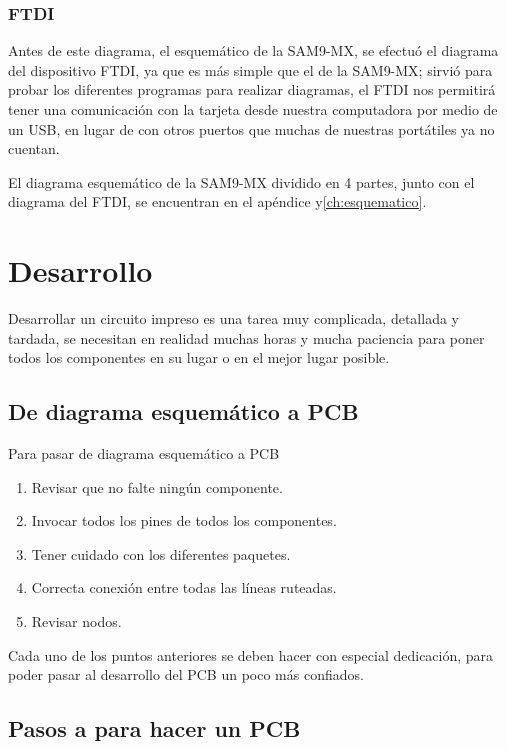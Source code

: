 \subsubsection*{FTDI}

Antes de este diagrama, el esquemático de la \ac{SAM}9-MX, se efectuó
el diagrama del dispositivo FTDI, ya que es más simple que el de la
\ac{SAM}9-MX; sirvió para probar los diferentes programas para realizar
diagramas, el FTDI nos permitirá tener una comunicación con la tarjeta
desde nuestra computadora por medio de un USB, en lugar de con otros
puertos que muchas de nuestras portátiles ya no cuentan.

El diagrama esquemático de la \ac{SAM}9-MX dividido en 4 partes,
junto con el diagrama del FTDI, se encuentran en el apéndice y\ref{ch:esquematico}.

\section{Desarrollo}

Desarrollar un circuito impreso es una tarea muy complicada, detallada y tardada, se necesitan en realidad muchas horas y mucha paciencia para poner todos los componentes en su lugar o en el mejor lugar posible.

\subsection{De diagrama esquemático a PCB}

Para pasar de diagrama esquemático a PCB

\begin{enumerate}
\item Revisar que no falte ningún componente.
\item Invocar todos los pines de todos los componentes.
\item Tener cuidado con los diferentes paquetes.
\item Correcta conexión entre todas las líneas ruteadas. 
\item Revisar nodos.
\end{enumerate}

Cada uno de los puntos anteriores se deben hacer con especial dedicación, para poder pasar al desarrollo del PCB un poco más confiados.

\subsection{Pasos a para hacer un PCB}

